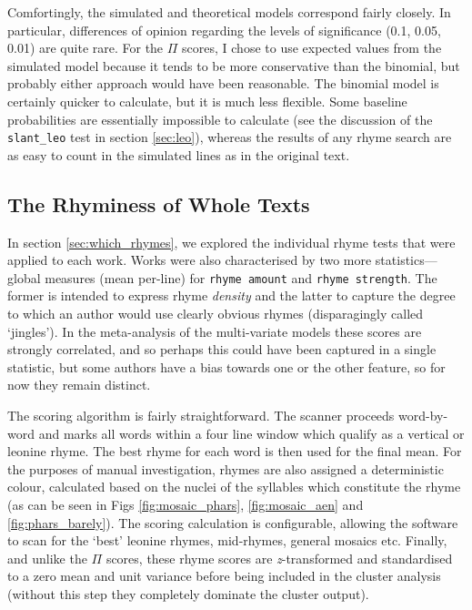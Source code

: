 \documentclass[twocolumn, switch]{article} %
\begin{document}
Comfortingly, the simulated and theoretical models correspond fairly closely.
In particular, differences of opinion regarding the levels of significance
(0.1, 0.05, 0.01) are quite rare. For the $\Pi$ scores, I chose to use
expected values from the simulated model because it tends to be more
conservative than the binomial, but probably either approach would have been
reasonable. The binomial model is certainly quicker to calculate, but it is
much less flexible. Some baseline probabilities are essentially impossible to
calculate (see the discussion of the \texttt{slant\_leo} test in section
\ref{sec:leo}), whereas the results of any rhyme search are as easy to count
in the simulated lines as in the original text.

\subsection{The Rhyminess of Whole Texts}
\label{sec:whole_rhyminess}

In section \ref{sec:which_rhymes}, we explored the individual rhyme tests that
were applied to each work. Works were also characterised by two more
statistics---global measures (mean per-line) for \texttt{rhyme amount} and
\texttt{rhyme strength}. The former is intended to express rhyme
\emph{density} and the latter to capture the degree to which an author would
use clearly obvious rhymes (disparagingly called `jingles'). In the
meta-analysis of the multi-variate models these scores are strongly
correlated, and so perhaps this could have been captured in a single
statistic, but some authors have a bias towards one or the other feature,
so for now they remain distinct.

The scoring algorithm is fairly straightforward. The scanner proceeds
word-by-word and marks all words within a four line window which qualify as a
vertical or leonine rhyme. The best rhyme for each word is then used for the
final mean. For the purposes of manual investigation, rhymes are also assigned
a deterministic colour, calculated based on the nuclei of the syllables which
constitute the rhyme (as can be seen in Figs \ref{fig:mosaic_phars},
\ref{fig:mosaic_aen} and \ref{fig:phars_barely}). The scoring calculation is
configurable, allowing the software to scan for the `best' leonine rhymes,
mid-rhymes, general mosaics etc. Finally, and unlike the $\Pi$ scores, these
rhyme scores are \emph{z}-transformed and standardised to a zero mean and unit
variance before being included in the cluster analysis (without this step they
completely dominate the cluster output).
\end{document}
